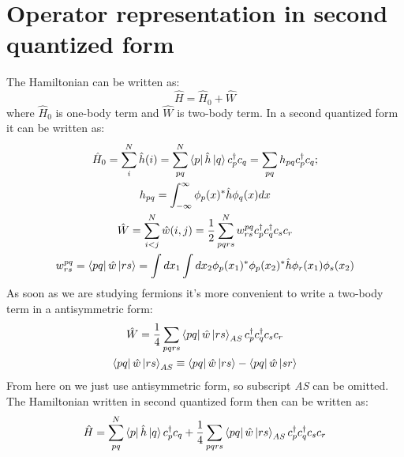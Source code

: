 \documentclass[twoside,english]{uiofysmaster}
\theoremstyle{definition}
\begin{document}
\section{Operator representation in second quantized form} \label{sec:operator in 2q}
The Hamiltonian can be written as:
\begin{equation}
\hat{H}=\hat{H}_0+\hat{W}
\end{equation}
where $\hat{H}_0$ is one-body term and $\hat{W}$ is two-body term.
In a second quantized form it can be written as:
\begin{gather}
\hat{H}_0= \sum_i^N\hat{h}(i)=\sum_{pq}^{N}\bra{p}\hat{h}\ket{q}c_p^\dagger c_q=\sum_{pq}h_{pq}c_p^\dagger c_q;\\ \label{eq:H0}
h_{pq}=\int_{-\infty}^{\infty}\phi_p(x)^* \hat{h}\phi_q(x) dx\\
\hat{W}=\sum_{i<j}^{N} \hat{w}(i,j)=\frac{1}{2}\sum_{pqrs}^{N} w_{rs}^{pq}c_p^\dagger c_q^\dagger c_sc_r\\ \label{eq:W}
w_{rs}^{pq}=\bra{pq}\hat{w}\ket{rs}=\int dx_1 \int dx_2 \phi_p(x_1)^*\phi_p(x_2)^* \hat{h}\phi_r(x_1)\phi_s(x_2) 
\end{gather}
As soon as we are studying fermions it's more convenient to write a two-body term in a antisymmetric form:
\begin{gather}\label{eq:two-body_2q}
	\hat{W}=\frac{1}{4}\sum_{pqrs} \bra{pq}\hat{w}\ket{rs}_{AS} c_p^\dagger c_q^\dagger c_sc_r\\
	\bra{pq}\hat{w}\ket{rs}_{AS}\equiv \bra{pq}\hat{w}\ket{rs}-\bra{pq}\hat{w}\ket{sr}
\end{gather}
From here on we just use antisymmetric form, so subscript \textit{AS} can be omitted.\\
The Hamiltonian written in second quantized form then can be written as:
\begin{equation}\label{eq:Ham in 2q}
\hat{H}=\sum_{pq}^{N}\bra{p}\hat{h}\ket{q}c_p^\dagger c_q + \frac{1}{4}\sum_{pqrs} \bra{pq}\hat{w}\ket{rs}_{AS} c_p^\dagger c_q^\dagger c_sc_r
\end{equation}
\end{document}

